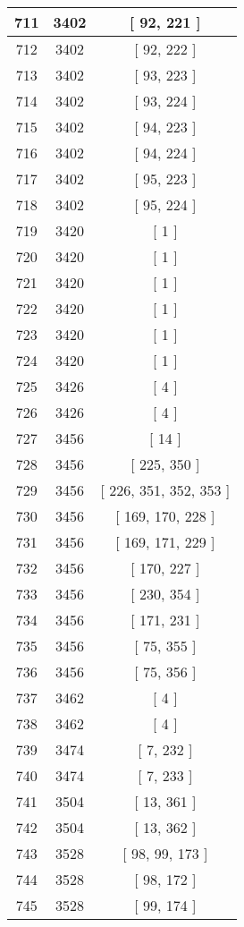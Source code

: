 \begin{center}
\begin{longtable}[H]{|| c c c ||}
\hline
711 & 3402 & [ 92, 221 ] \\ 
\hline
712 & 3402 & [ 92, 222 ] \\ 
\hline
713 & 3402 & [ 93, 223 ] \\ 
\hline
714 & 3402 & [ 93, 224 ] \\ 
\hline
715 & 3402 & [ 94, 223 ] \\ 
\hline
716 & 3402 & [ 94, 224 ] \\ 
\hline
717 & 3402 & [ 95, 223 ] \\ 
\hline
718 & 3402 & [ 95, 224 ] \\ 
\hline
719 & 3420 & [ 1 ] \\ 
\hline
720 & 3420 & [ 1 ] \\ 
\hline
721 & 3420 & [ 1 ] \\ 
\hline
722 & 3420 & [ 1 ] \\ 
\hline
723 & 3420 & [ 1 ] \\ 
\hline
724 & 3420 & [ 1 ] \\ 
\hline
725 & 3426 & [ 4 ] \\ 
\hline
726 & 3426 & [ 4 ] \\ 
\hline
727 & 3456 & [ 14 ] \\ 
\hline
728 & 3456 & [ 225, 350 ] \\ 
\hline
729 & 3456 & [ 226, 351, 352, 353 ] \\ 
\hline
730 & 3456 & [ 169, 170, 228 ] \\ 
\hline
731 & 3456 & [ 169, 171, 229 ] \\ 
\hline
732 & 3456 & [ 170, 227 ] \\ 
\hline
733 & 3456 & [ 230, 354 ] \\ 
\hline
734 & 3456 & [ 171, 231 ] \\ 
\hline
735 & 3456 & [ 75, 355 ] \\ 
\hline
736 & 3456 & [ 75, 356 ] \\ 
\hline
737 & 3462 & [ 4 ] \\ 
\hline
738 & 3462 & [ 4 ] \\ 
\hline
739 & 3474 & [ 7, 232 ] \\ 
\hline
740 & 3474 & [ 7, 233 ] \\ 
\hline
741 & 3504 & [ 13, 361 ] \\ 
\hline
742 & 3504 & [ 13, 362 ] \\ 
\hline
743 & 3528 & [ 98, 99, 173 ] \\ 
\hline
744 & 3528 & [ 98, 172 ] \\ 
\hline
745 & 3528 & [ 99, 174 ] \\ 

\end{longtable}
\end{center}
